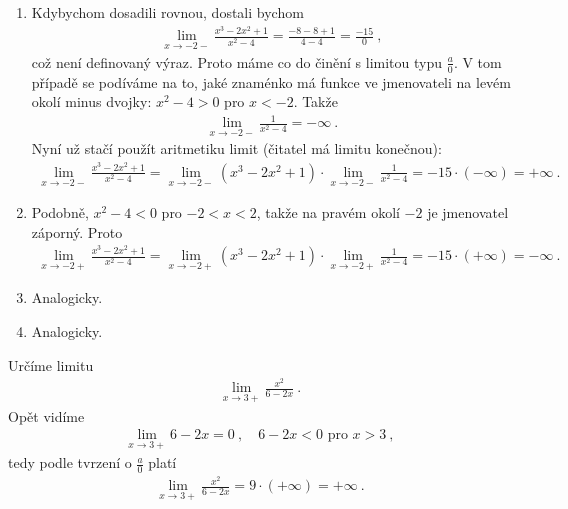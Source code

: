 \begin{example}
\begin{enumerate}[label=(\roman*)]
        \item Kdybychom dosadili rovnou, dostali bychom
        \begin{align}
            \lim_{x \rightarrow -2 -} \frac{x^3-2x^2+1}{x^2-4} = \frac{-8 - 8 + 1}{4 - 4} = \frac{-15}{0} \:,
        \end{align}
        což není definovaný výraz. Proto máme co do činění s limitou typu $\frac{a}{0}$. V tom případě se podíváme na to, jaké znaménko má funkce ve jmenovateli na levém okolí minus dvojky: $x^2-4 > 0$ pro $x<-2$. Takže 
        \begin{align}
            \lim_{x \rightarrow -2 -} \frac{1}{x^2-4} = - \infty \:.
        \end{align}
        Nyní už stačí použít aritmetiku limit (čitatel má limitu konečnou):
        \begin{align}
            \lim_{x \rightarrow -2 -} \frac{x^3-2x^2+1}{x^2-4} = \lim_{x \rightarrow -2 -} (x^3-2x^2+1) \cdot \lim_{x \rightarrow -2 -} \frac{1}{x^2-4} = -15 \cdot (-\infty) = + \infty \:.
        \end{align}

        \item Podobně, $x^2-4<0$ pro $-2<x<2$, takže na pravém okolí $-2$ je jmenovatel záporný. Proto
        \begin{align}
            \lim_{x \rightarrow -2 +} \frac{x^3-2x^2+1}{x^2-4} = \lim_{x \rightarrow -2 +} (x^3-2x^2+1) \cdot \lim_{x \rightarrow -2 +} \frac{1}{x^2-4} = -15 \cdot (+\infty) = - \infty \:.
        \end{align}
        \item Analogicky.
        \item Analogicky.
    \end{enumerate}
\end{example}

\begin{example}
    Určíme limitu
    \begin{align}
        \lim_{x \rightarrow 3+} \frac{x^2}{6-2x} \:.
    \end{align}
    Opět vidíme
    \begin{align}
        \lim_{x \rightarrow 3+} 6 - 2x = 0 \:, \quad 6 - 2x < 0 \text{ pro } x>3 \:,
    \end{align}
    tedy podle tvrzení o $\frac{a}{0}$ platí
    \begin{align}
        \lim_{x \rightarrow 3+} \frac{x^2}{6-2x} = 9 \cdot (+\infty) = + \infty \:.
    \end{align}
\end{example}


